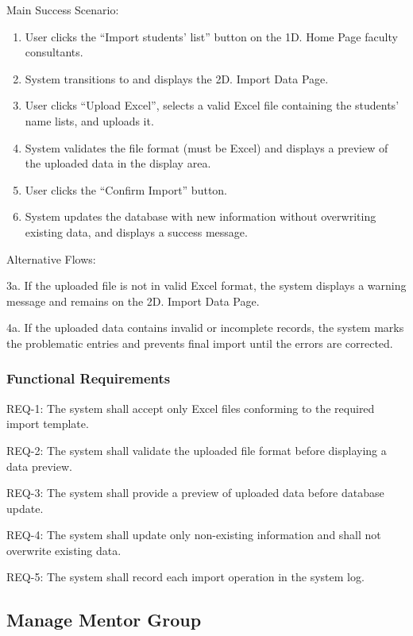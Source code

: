 Main Success Scenario:
\begin{enumerate}
\item User clicks the ``Import students' list'' button on the 1D. Home Page faculty consultants.
\item System transitions to and displays the 2D. Import Data Page.
\item User clicks ``Upload Excel'', selects a valid Excel file containing the students' name lists, and uploads it.
\item System validates the file format (must be Excel) and displays a preview of the uploaded data in the display area.
\item User clicks the ``Confirm Import'' button.
\item System updates the database with new information without overwriting existing data, and displays a success message.
\end{enumerate}

Alternative Flows:

3a. If the uploaded file is not in valid Excel format, the system displays a warning message and remains on the 2D. Import Data Page.

4a. If the uploaded data contains invalid or incomplete records, the system marks the problematic entries and prevents final import until the errors are corrected.

\subsubsection{Functional Requirements}

REQ-1: The system shall accept only Excel files conforming to the required import template.

REQ-2: The system shall validate the uploaded file format before displaying a data preview.

REQ-3: The system shall provide a preview of uploaded data before database update.

REQ-4: The system shall update only non-existing information and shall not overwrite existing data.

REQ-5: The system shall record each import operation in the system log.

\subsection{Manage Mentor Group}

